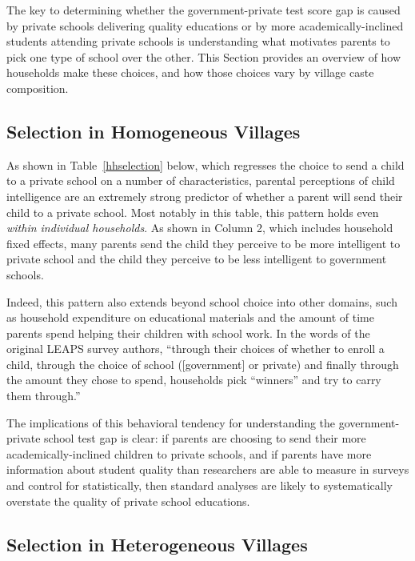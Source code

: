 \documentclass[Eubank_pk_ethnic_sorting.tex]{subfiles}
\begin{document}
The key to determining whether the government-private test score gap is caused by private schools delivering quality educations or by more academically-inclined students attending private schools is understanding what motivates parents to pick one type of school over the other. This Section provides an overview of how households make these choices, and how those choices vary by village caste composition. 


\subsection{Selection in Homogeneous Villages}\label{}

As shown in Table~\ref{hhselection} below, which regresses the choice to send a child to a private school on a number of characteristics, parental perceptions of child intelligence are an extremely strong predictor of whether a parent will send their child to a private school. Most notably in this table, this pattern holds even \emph{within individual households}. As shown in Column 2, which includes household fixed effects, many parents send the child they perceive to be more intelligent to private school and the child they perceive to be less intelligent to government schools. 



Indeed, this pattern also extends beyond school choice into other domains, such as household expenditure on  educational materials and the amount of time parents spend helping their children with school work. In the words of the original LEAPS survey authors, ``through their choices of whether to enroll a child, through the choice of school ([government] or private) and finally through the amount they chose to spend, households pick ``winners'' and try to carry them through.'' \citep[p. 103]{Andrabi:2007we}

The implications of this behavioral tendency for understanding the government-private school test gap is clear: if parents are choosing to send their more academically-inclined children to private schools, and if parents have more information about student quality than researchers are able to measure in surveys and control for statistically, then standard analyses are likely to systematically overstate the quality of private school educations. 

\subsection{Selection in Heterogeneous Villages}\label{}
\end{document}
